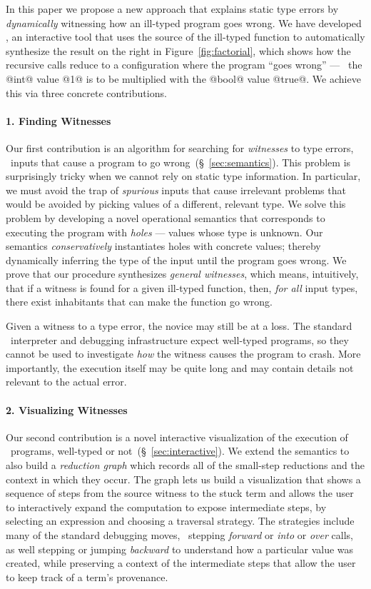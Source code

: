 In this paper we propose a new approach that explains
static type errors by \emph{dynamically} witnessing
how an ill-typed program goes wrong.
%
We have developed \toolname, an interactive tool that uses
the source of the ill-typed function to automatically synthesize
the result on the right in Figure~\ref{fig:factorial}, which
shows how the recursive calls reduce to a configuration where
the program ``goes wrong'' --- \ie\ the @int@ value @1@ is to be
multiplied with the @bool@ value @true@.
We achieve this via three concrete contributions.

\paragraph{1. Finding Witnesses}
Our first contribution is an algorithm for searching for
\emph{witnesses} to type errors, \ie\ inputs that cause a
program to go wrong~(\S~\ref{sec:semantics}).
%
This problem is surprisingly tricky when we cannot rely on
static type information.
%
In particular, we must avoid the trap of \emph{spurious} inputs
that cause irrelevant problems that would be avoided by picking
values of a different, relevant type.
%
We solve this problem by developing a novel operational semantics
that corresponds to executing the program with \emph{holes} ---
values whose type is unknown.
%
Our semantics \emph{conservatively} instantiates holes with concrete
values; thereby dynamically inferring the type of the input
until the program goes wrong.
%
We prove that our procedure synthesizes \emph{general witnesses},
which means, intuitively, that if a witness is found for a given
ill-typed function, then, \emph{for all} input types, there exist
inhabitants that can make the function go wrong.

Given a witness to a type error, the novice may still be at a loss.
%
The standard \ocaml\ interpreter and debugging infrastructure expect
well-typed programs, so they cannot be used to investigate \emph{how}
the witness causes the program to crash.
%
More importantly, the execution itself may be quite long and may contain
details not relevant to the actual error.

\paragraph{2. Visualizing Witnesses}
Our second contribution is a novel interactive visualization of the
execution of \ocaml\ programs, well-typed or not~(\S~\ref{sec:interactive}).
%
We extend the semantics to also build a \emph{reduction graph}
which records all of the small-step reductions and the context
in which they occur.
%
The graph lets us build a visualization that shows a sequence of
steps from the source witness to the stuck term and allows the user
to interactively expand the computation to expose intermediate steps,
by selecting an expression and choosing a traversal strategy.
%
The strategies include many of the standard debugging moves, \eg\
stepping \emph{forward} or \emph{into} or \emph{over} calls, as well
stepping or jumping \emph{backward} to understand how a particular
value was created, while preserving a context of the intermediate
steps that allow the user to keep track of a term's provenance.


